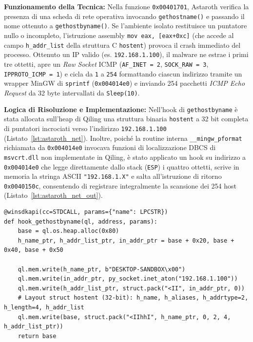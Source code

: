 \documentclass[11pt, a4paper]{article}
\begin{document}
\textbf{Funzionamento della Tecnica:} Nella funzione \texttt{0x00401701}, Astaroth verifica la presenza di una scheda di rete operativa invocando \texttt{gethostname()} e passando il nome ottenuto a \texttt{gethostbyname()}. Se l'ambiente isolato restituisce un puntatore nullo o incompleto, l'istruzione assembly \texttt{mov eax, [eax+0xc]} (che accede al campo \texttt{h\_\allowbreak{}addr\_\allowbreak{}list} della struttura C \texttt{hostent}) provoca il crash immediato del processo. Ottenuto un IP valido (es. \texttt{192.168.1.100}), il malware ne estrae i primi tre ottetti, apre un \textit{Raw Socket} ICMP (\texttt{AF\_INET = 2}, \texttt{SOCK\_\allowbreak{}RAW = 3}, \texttt{IPPROTO\_\allowbreak{}ICMP = 1}) e cicla da \texttt{1} a \texttt{254} formattando ciascun indirizzo tramite un wrapper MinGW di \texttt{sprintf} (\texttt{0x004014e0}) e inviando 254 pacchetti \textit{ICMP Echo Request} da 32 byte intervallati da \texttt{Sleep(10)}.

\textbf{Logica di Risoluzione e Implementazione:} Nell'hook di \texttt{gethostbyname} \`e stata allocata sull'heap di Qiling una struttura binaria \texttt{hostent} a 32 bit completa di puntatori incrociati verso l'indirizzo \texttt{192.168.1.100} (Listato~\ref{lst:astaroth_net}). Inoltre, poich\'e la routine interna \texttt{\_\_\allowbreak{}mingw\_\allowbreak{}pformat} richiamata da \texttt{0x004014e0} invocava funzioni di localizzazione DBCS di \texttt{msvcrt.dll} non implementate in Qiling, \`e stato applicato un hook su indirizzo a \texttt{0x004014e0} che legge direttamente dallo stack (\texttt{ESP}) i quattro ottetti, scrive in memoria la stringa ASCII \texttt{"192.168.1.\allowbreak{}X"} e salta all'istruzione di ritorno \texttt{0x0040150c}, consentendo di registrare integralmente la scansione dei 254 host (Listato~\ref{lst:astaroth_net_out}).

\begin{lstlisting}[style=pythoncode, caption={Costruzione manuale in RAM della struttura binaria hostent a 32 bit per sbloccare la scansione ICMP.}, label={lst:astaroth_net}]
@winsdkapi(cc=STDCALL, params={"name": LPCSTR})
def hook_gethostbyname(ql, address, params):
    base = ql.os.heap.alloc(0x80)
    h_name_ptr, h_addr_list_ptr, in_addr_ptr = base + 0x20, base + 0x40, base + 0x50

    ql.mem.write(h_name_ptr, b"DESKTOP-SANDBOX\x00")
    ql.mem.write(in_addr_ptr, py_socket.inet_aton("192.168.1.100"))
    ql.mem.write(h_addr_list_ptr, struct.pack("<II", in_addr_ptr, 0))
    # Layout struct hostent (32-bit): h_name, h_aliases, h_addrtype=2, h_length=4, h_addr_list
    ql.mem.write(base, struct.pack("<IIhhI", h_name_ptr, 0, 2, 4, h_addr_list_ptr))
    return base
\end{lstlisting}
\end{document}
